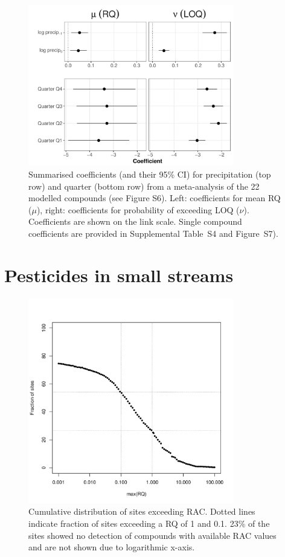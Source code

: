\documentclass[pdftex,
	a4paper,
	titlepage=false]{scrreprt}
\begin{document}
\begin{figure}[ht]
\centering
  \includegraphics[width=0.8\textwidth]{mean_coef.pdf}
  \caption{Summarised coefficients (and their 95\% CI) for precipitation (top row) and quarter (bottom row) from a meta-analysis of the 22 modelled compounds (see Figure S6). Left: coefficients for mean RQ ($\mu$), right: coefficients for probability of exceeding LOQ ($\nu$). 
  Coefficients are shown on the link scale.
  Single compound coefficients are provided in Supplemental Table~S4 and Figure~S7).
  }
  \label{fig:mean_coefs}
\end{figure}


\chapter{Pesticides in small streams}


\begin{figure}[ht]
	\centering
	\includegraphics[width = 0.8\textwidth]{prac_ex}
	\caption[Cumulative distribution of the number sites exceeding RAC.]{Cumulative distribution of sites exceeding RAC. Dotted lines indicate fraction of sites exceeding a RQ of 1 and 0.1. 23\% of the sites showed no detection of compounds with available RAC values and are not shown due to logarithmic x-axis.}
	\label{fig:prac_ex}
\end{figure}
\end{document}
